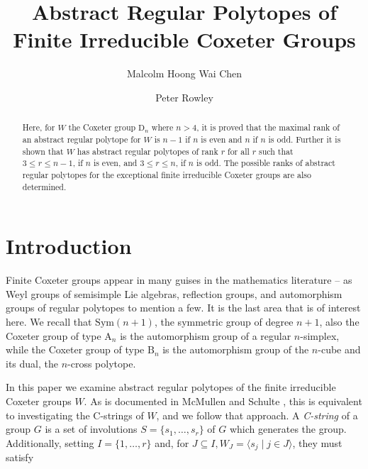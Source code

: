 \documentclass{amsart}
\numberwithin{equation}{section}
\theoremstyle{plain} %
\begin{document}
\title[Abstract Regular Polytopes of Finite Irreducible Coxeter Groups]{Abstract Regular Polytopes of \\ Finite Irreducible Coxeter Groups} 

\author{Malcolm Hoong Wai Chen} \address{Department of Mathematics, University of Manchester, Manchester, United Kingdom.} 
\author{Peter Rowley} \address{Department of Mathematics, University of Manchester, Manchester, United Kingdom.} 


\begin{abstract}

Here, for $W$ the Coxeter group $\mathrm{D}_n$ where $n > 4$, it is proved that the maximal rank of an abstract regular polytope for $W$ is $n - 1$ if $n$ is even and $n$ if $n$ is odd. Further it is shown that $W$ has abstract regular polytopes of rank $r$ for all $r$ such that $3 \leq r \leq n - 1$, if $n$ is even, and $3 \leq r \leq n$, if $n$ is odd. The possible ranks of abstract regular polytopes for the exceptional finite irreducible  Coxeter groups are also determined.

\end{abstract}

\maketitle

\section{Introduction}\label{introduction}

Finite Coxeter groups appear in many guises in the mathematics literature -- as Weyl groups of semisimple Lie algebras, reflection groups, and automorphism groups of regular polytopes to mention a few. It is the last area that is of interest here.  We recall that $\mathrm{Sym}(n+1)$, the symmetric group of degree $n + 1$, also the Coxeter group of type $\mathrm{A}_n$ is the automorphism group of a regular $n$-simplex, while the Coxeter group of type $\mathrm{B}_n$ is the automorphism group of the $n$-cube and its dual, the $n$-cross polytope.

In this paper we examine abstract regular polytopes of the finite irreducible Coxeter groups $W$.  As is documented in McMullen and Schulte \cite{arpbible}, this is equivalent to investigating the C-strings of $W$, and we follow that approach. A \emph{C-string} of a group $G$ is a set of involutions $S = \{s_1, \dots , s_r \}$ of $G$ which generates the group. Additionally, setting $I = \{ 1, \dots, r \}$ and,  for $J \subseteq I, W_J = \langle s_j \;| \;  j \in J \rangle$,  they must satisfy
\end{document}
